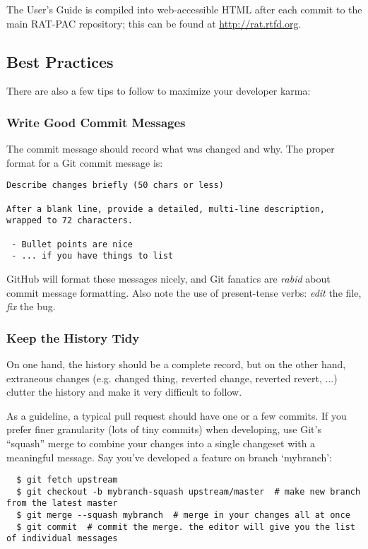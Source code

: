 \documentclass{article}
\begin{document}
The User's Guide is compiled into web-accessible HTML after each commit to
the main RAT-PAC repository; this can be found at
\href{http://rat.rtfd.org}{http://rat.rtfd.org}.

\subsection{Best Practices}
\label{sec:best-practices}
There are also a few tips to follow to maximize your developer karma:

\subsubsection{Write Good Commit Messages} The commit message should record
what was changed and why. The proper format for a Git commit message is:

\begin{verbatim}
Describe changes briefly (50 chars or less)

After a blank line, provide a detailed, multi-line description,
wrapped to 72 characters.

 - Bullet points are nice
 - ... if you have things to list
\end{verbatim}
GitHub will format these messages nicely, and Git fanatics are {\it rabid}
about commit message formatting. Also note the use of present-tense verbs:
{\it edit} the file, {\it fix} the bug.

\subsubsection{Keep the History Tidy} On one hand, the
history should be a complete record, but on the other hand, extraneous changes
(e.g. changed thing, reverted change, reverted revert, ...) clutter the
history and make it very difficult to follow.

As a guideline, a typical pull request should have one or a few commits. If
you prefer finer granularity (lots of tiny commits) when developing, use Git's
``squash'' merge to combine your changes into a single changeset with a
meaningful message. Say you've developed a feature on branch `mybranch':

\begin{verbatim}
  $ git fetch upstream
  $ git checkout -b mybranch-squash upstream/master  # make new branch from the latest master
  $ git merge --squash mybranch  # merge in your changes all at once
  $ git commit  # commit the merge. the editor will give you the list of individual messages
\end{verbatim}
\end{document}
